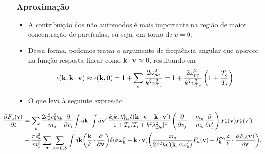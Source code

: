 \documentclass[10pt,aspectratio=1610,lualatex]{beamer}
\begin{document}
\begin{frame}
  \frametitle{Aproximação}
  \begin{itemize}
    \item A contribuição dos não automodos é mais importante na região
    de maior concentração de partículas, ou seja,  em torno de $v=0$;
    \vspace{0.2cm}
    \item Dessa forma, podemos tratar o argumento de frequência angular
    que aparece na função resposta linear como ${\bf k \cdot v}\approx 0$,
    resultando em
    \begin{displaymath}
      \epsilon({\bf k},{\bf k \cdot v})\approx
      \epsilon({\bf k},0)=1+\sum_a \frac{2 \omega_{pa}^2}{k^2v_{T_a}^2}
      =1+\frac{2 \omega_{pe}^2}{k^2v_{Te}^2}\left( 1+\frac{T_e}{T_i} \right)
    \end{displaymath}\vspace{-0.4cm}
    \pause
    \item O que leva à seguinte expressão
  \end{itemize}
  \vspace{0.3cm}
  \begin{equation*}
    \hspace{-0.85cm}
    \begin{split}
      \frac{\partial F_a({\bf v})}{\partial t}
      &=\sum_b\frac{2e_a^2e_b^2n_b}{m_a}
      \frac{\partial }{\partial v_i}\int d{\bf k}\ \int d{\bf v'}\,
      \frac{k_ik_j\lambda_{De}^4 \delta({\bf k \cdot v - k \cdot v'})}
      {|1+T_e/T_i+k^2 \lambda_{De}^2|^2} \left(\frac{\partial }{\partial v_j}
	-\frac{m_a}{m_b}\frac{\partial }{\partial v'_j}\right)
      F_a({\bf v})F_b({\bf v'})\\
      &+\frac{\pi e_a^2}{m_a^2}\sum_\sigma\sum_{\alpha=L,S}
      \int d{\bf k} \biggl(\frac{\bf k}{k}
      \cdot\frac{\partial}{\partial{\bf v}}\biggr)
      \delta(\sigma\omega_{\bf k}^\alpha-{\bf k}\cdot{\bf v})
      \biggl(\frac{m_a}{2\pi^2k\epsilon '({\bf k},\sigma\omega_{\bf k}^L)}
      F_a({\bf v})+I_{\bf k}^{\sigma\alpha} \frac{\bf k}{k}\cdot
      \frac{\partial F_a({\bf v})}{\partial{\bf v}}\biggr).
    \end{split}
  \end{equation*}  
\end{frame}
\end{document}
